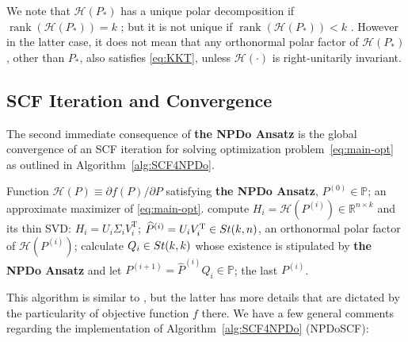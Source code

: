 \documentclass[11pt]{article}
\def\bbP{\mathbb{P}}
\def\bbR{\mathbb{R}}
\def\scrH{\mathscr{H}}
\def\what{\widehat}
\newcommand\STM[2]{{\rm St}(#1,#2)}
\DeclareMathOperator{\rank}{rank}
\DeclareMathOperator{\T}{T}
\theoremstyle{definition}
\numberwithin{equation}{section}
\begin{document}
We note that $\scrH(P_*)$ has a unique polar decomposition if $\rank(\scrH(P_*))=k$ \cite{li:1995};
but it is not unique if $\rank(\scrH(P_*))<k$ \cite{high:2008,li:1993b,li:2014HLA}. However in the latter case,
it does not mean that any orthonormal polar factor of $\scrH(P_*)$, other than $P_*$, also satisfies \eqref{eq:KKT}, unless
$\scrH(\cdot)$ is right-unitarily invariant.



\subsection{SCF Iteration and Convergence}\label{ssec:SCF4NPD}
The second immediate consequence of {\bf the NPDo Ansatz} is the global convergence of
an SCF iteration for solving optimization problem~\eqref{eq:main-opt} as outlined in Algorithm~\ref{alg:SCF4NPDo}.
%
\begin{algorithm}[t]
\caption{NPDoSCF: NPDo \eqref{eq:KKT} solved by SCF} \label{alg:SCF4NPDo}
\begin{algorithmic}[1]
\REQUIRE Function $\scrH(P)\equiv\partial f(P)/\partial P$ satisfying {\bf the NPDo Ansatz}, $P^{(0)}\in\bbP$;
\ENSURE  an approximate maximizer of \eqref{eq:main-opt}. %
    \STATE compute $H_i=\scrH(P^{(i)})\in\bbR^{n\times k}$ and its thin SVD: $H_i=U_i\Sigma_iV_i^{\T}$;
    \STATE $\what P^{(i)}=U_iV_i^{\T}\in\STM{k}{n}$,
           an orthonormal polar factor of  $\scrH(P^{(i)})$;
    \STATE calculate $Q_i\in\STM{k}{k}$ whose existence is stipulated by {\bf the NPDo Ansatz}
           and let $P^{(i+1)}=\what P^{(i)}Q_i\in\bbP$;
\ENDFOR
\RETURN the last $P^{(i)}$.
\end{algorithmic}
\end{algorithm}
%
This algorithm is similar to \cite[Algorithm 3.1]{wazl:2022a}, but the latter has more details that are dictated by
the particularity of objective function $f$ there.
We have a few general comments regarding the implementation of
Algorithm~\ref{alg:SCF4NPDo} (NPDoSCF):
\end{document}
